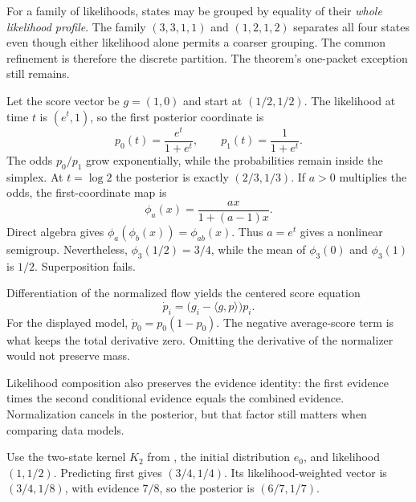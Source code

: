 For a family of likelihoods, states may be grouped by equality of their \emph{whole likelihood profile}. The family $(3,3,1,1)$ and $(1,2,1,2)$ separates all four states even though either likelihood alone permits a coarser grouping. The common refinement is therefore the discrete partition. The theorem's one-packet exception still remains.

Let the score vector be $g=(1,0)$ and start at $(1/2,1/2)$. The likelihood at time $t$ is $(e^t,1)$, so the first posterior coordinate is
\[
p_0(t)=\frac{e^t}{1+e^t},\qquad p_1(t)=\frac1{1+e^t}.
\]
The odds $p_0/p_1$ grow exponentially, while the probabilities remain inside the simplex. At $t=\log 2$ the posterior is exactly $(2/3,1/3)$.
If $a>0$ multiplies the odds, the first-coordinate map is
\[
\phi_a(x)=\frac{ax}{1+(a-1)x}.
\]
Direct algebra gives $\phi_a(\phi_b(x))=\phi_{ab}(x)$. Thus $a=e^t$ gives a nonlinear semigroup. Nevertheless, $\phi_3(1/2)=3/4$, while the mean of $\phi_3(0)$ and $\phi_3(1)$ is $1/2$. Superposition fails.

Differentiation of the normalized flow yields the centered score equation
\[
\dot p_i=\bigl(g_i-\langle g,p\rangle\bigr)p_i.
\]
For the displayed model, $\dot p_0=p_0(1-p_0)$. The negative average-score term is what keeps the total derivative zero. Omitting the derivative of the normalizer would not preserve mass.

Likelihood composition also preserves the evidence identity: the first evidence times the second conditional evidence equals the combined evidence. Normalization cancels in the posterior, but that factor still matters when comparing data models.

Use the two-state kernel $K_2$ from , the initial distribution $e_0$, and likelihood $(1,1/2)$. Predicting first gives $(3/4,1/4)$. Its likelihood-weighted vector is $(3/4,1/8)$, with evidence $7/8$, so the posterior is $(6/7,1/7)$.

